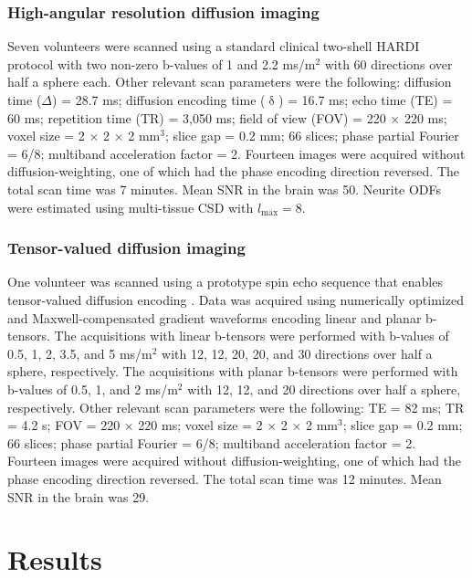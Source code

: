 \documentclass[10pt, letterpaper, oneside]{article}
\begin{document}
\subsubsection{High-angular resolution diffusion imaging}

Seven volunteers were scanned using a standard clinical two-shell HARDI protocol with two non-zero b-values of 1 and 2.2 ms/\textmu m$^2$  with 60 directions over half a sphere each. Other relevant scan parameters were the following: diffusion time ($\Delta$) = 28.7 ms; diffusion encoding time ($\updelta$) = 16.7 ms; echo time (TE) = 60 ms; repetition time (TR) = 3,050 ms; field of view (FOV) = 220 × 220 ms; voxel size = 2 × 2 × 2 mm$^3$; slice gap = 0.2 mm; 66 slices; phase partial Fourier = 6/8; multiband acceleration factor = 2. Fourteen images were acquired without diffusion-weighting, one of which had the phase encoding direction reversed. The total scan time was 7 minutes. Mean SNR in the brain was 50. Neurite ODFs were estimated using multi-tissue CSD \citep{jeurissen2014multi} with $l_\text{max} = 8$.

\subsubsection{Tensor-valued diffusion imaging}

One volunteer was scanned using a prototype spin echo sequence that enables tensor-valued diffusion encoding \citep{szczepankiewicz2019tensor}. Data was acquired using numerically optimized \citep{sjolund2015constrained} and Maxwell-compensated \citep{szczepankiewicz2019maxwell} gradient waveforms encoding linear and planar b-tensors. The acquisitions with linear b-tensors were performed with b-values of 0.5, 1, 2, 3.5, and 5 ms/\textmu m$^2$ with 12, 12, 20, 20, and 30 directions over half a sphere, respectively. The acquisitions with planar b-tensors were performed with b-values of 0.5, 1, and 2 ms/\textmu m$^2$ with 12, 12, and 20 directions over half a sphere, respectively. Other relevant scan parameters were the following: TE = 82 ms; TR = 4.2 s; FOV = 220 × 220 ms; voxel size = 2 × 2 × 2 mm$^3$; slice gap = 0.2 mm; 66 slices; phase partial Fourier = 6/8; multiband acceleration factor = 2. Fourteen images were acquired without diffusion-weighting, one of which had the phase encoding direction reversed. The total scan time was 12 minutes. Mean SNR in the brain was 29.

\section{Results}
\end{document}
